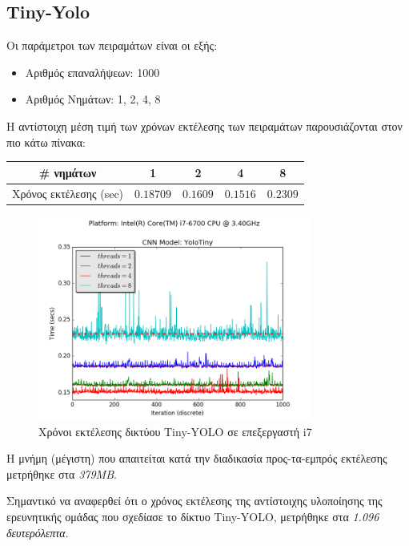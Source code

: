 
\subsection{Tiny-Yolo}

Οι παράμετροι των πειραμάτων είναι οι εξής:
\begin{itemize}
  \item{Αριθμός επαναλήψεων: 1000}
  \item{Αριθμός Νημάτων: 1, 2, 4, 8}
\end{itemize}

Η αντίστοιχη μέση τιμή των χρόνων εκτέλεσης των πειραμάτων παρουσιάζονται στον πιο κάτω πίνακα:

\begin{center}
  \small
  \begin{tabular}{ | c | c | c | c | c | }
    \hline
    \rowcolor{Gray}
    \# νημάτων & 1 & 2 & 4 & 8 \\
    \hline
    Χρόνος εκτέλεσης (sec) & $0.18709$ & $0.1609$ & $0.1516$ & $0.2309$ \\
    \hline
  \end{tabular}
\end{center}

\begin{figure}[!ht]
  \centering
  \includegraphics[width=0.8\textwidth]{./images/chapter6/benchmark_yolotiny_i7.png}
  \caption[Χρόνoι εκτέλεσης δικτύου Tiny-YOLO σε επεξεργαστή i7]{Χρόνοι εκτέλεσης δικτύου Tiny-YOLO σε επεξεργαστή i7}
  \label{fig:yolotiny_results_i7}
\end{figure}

Η μνήμη (μέγιστη) που απαιτείται κατά την διαδικασία
προς-τα-εμπρός εκτέλεσης μετρήθηκε στα \emph{379MB}.

Σημαντικό να αναφερθεί ότι ο χρόνος εκτέλεσης της αντίστοιχης υλοποίησης της ερευνητικής ομάδας
που σχεδίασε το δίκτυο Tiny-YOLO, μετρήθηκε στα \emph{1.096 δευτερόλεπτα}.

